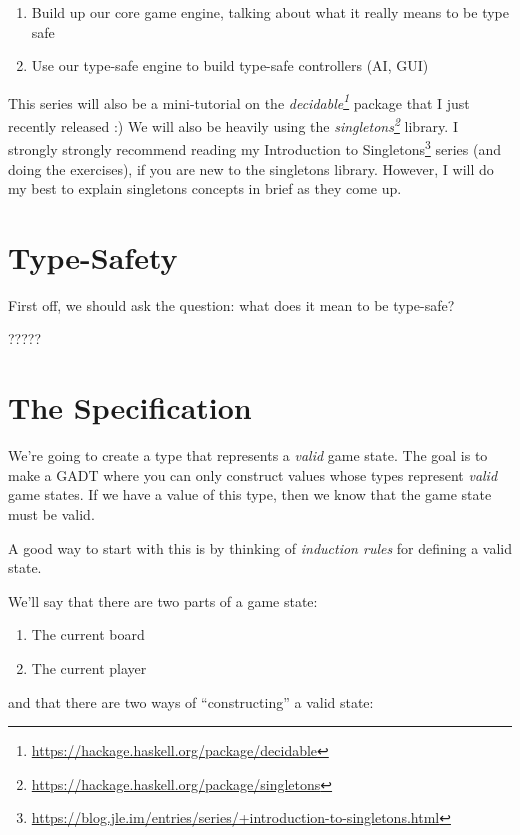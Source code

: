 \documentclass[]{article}
\renewcommand{\href}[2]{#2\footnote{\url{#1}}}
\begin{document}
\begin{enumerate}
\def\labelenumi{\arabic{enumi}.}
\tightlist
\item
  Build up our core game engine, talking about what it really means to be type
  safe
\item
  Use our type-safe engine to build type-safe controllers (AI, GUI)
\end{enumerate}

This series will also be a mini-tutorial on the
\emph{\href{https://hackage.haskell.org/package/decidable}{decidable}} package
that I just recently released :) We will also be heavily using the
\emph{\href{https://hackage.haskell.org/package/singletons}{singletons}}
library. I strongly strongly recommend reading my
\href{https://blog.jle.im/entries/series/+introduction-to-singletons.html}{Introduction
to Singletons} series (and doing the exercises), if you are new to the
singletons library. However, I will do my best to explain singletons concepts in
brief as they come up.

\section{Type-Safety}\label{type-safety}

First off, we should ask the question: what does it mean to be type-safe?

?????

\section{The Specification}\label{the-specification}

We're going to create a type that represents a \emph{valid} game state. The goal
is to make a GADT where you can only construct values whose types represent
\emph{valid} game states. If we have a value of this type, then we know that the
game state must be valid.

A good way to start with this is by thinking of \emph{induction rules} for
defining a valid state.

We'll say that there are two parts of a game state:

\begin{enumerate}
\def\labelenumi{\arabic{enumi}.}
\tightlist
\item
  The current board
\item
  The current player
\end{enumerate}

and that there are two ways of ``constructing'' a valid state:
\end{document}
